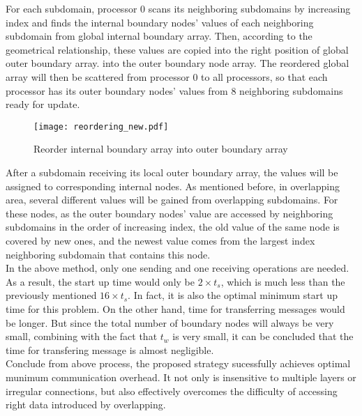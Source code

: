 \documentclass{sig-alternate}
\begin{document}
	For each subdomain, processor 0 scans its neighboring subdomains by increasing index and finds the internal boundary 
	nodes' values of each neighboring subdomain from global internal boundary array. Then, according to the geometrical relationship,
	these values are copied into the right position of global outer boundary array. into the outer boundary node array. The reordered 
	global array will then be scattered from processor 0 to all processors, so that each processor has its outer boundary nodes'
	values from 8 neighboring subdomains ready for update.\\ 
	\begin{figure}[htbp]
	  \centering
	  \texttt{[image: reordering\_new.pdf]}
	  \caption{Reorder internal boundary array into outer boundary array}
	  \label{Fig4}
	\end{figure}

	After a subdomain receiving its local outer boundary array, the values will be assigned to corresponding internal nodes. As 
	mentioned before, in overlapping area, several different values will be gained from overlapping subdomains. For these nodes, 
	as the outer boundary nodes' value are accessed by neighboring subdomains 
	in the order of increasing index, the old value of the same node is covered by new ones, and the newest value
	comes from the largest index neighboring subdomain that contains this node.\\  
	
	In the above method, only one sending and one receiving operations are needed. As a result, the start up time would only be 
	$2\times t_s$, which is much less than the previously mentioned $16\times t_s$. In fact, it is also the optimal minimum 
	start up time for this problem. On the other hand, time for transferring messages would be longer. But since the total number 
	of boundary nodes will always be very small, combining with the fact that $t_w$ is very small, it can be concluded that the 
	time for transfering message is almost negligible.\\ 

	Conclude from above process, the proposed strategy sucessfully achieves optimal munimum communication overhead. It  
	not only is insensitive to multiple layers or irregular connections, but also effectively overcomes the difficulty of 
	accessing right data introduced by overlapping.\\
	
\end{document}
